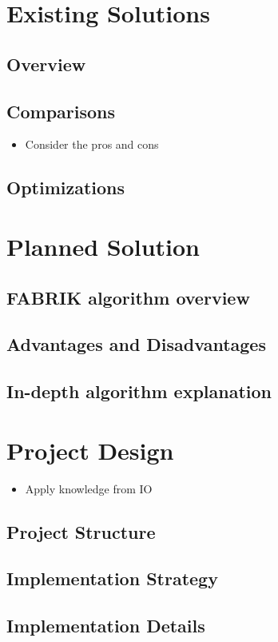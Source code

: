 \documentclass[a4paper, 12pt]{report} \linespread{1.3}
\begin{document}
\chapter{Existing Solutions}
\section{Overview}
\section{Comparisons}
\begin{itemize}
    \item Consider the pros and cons 
\end{itemize}
\section{Optimizations}

\chapter{Planned Solution}
\section{FABRIK algorithm overview}
\section{Advantages and Disadvantages}
\section{In-depth algorithm explanation}

\chapter{Project Design}
\begin{itemize}
    \item Apply knowledge from IO
\end{itemize}
\section{Project Structure}
\section{Implementation Strategy}
\section{Implementation Details}
\end{document}
